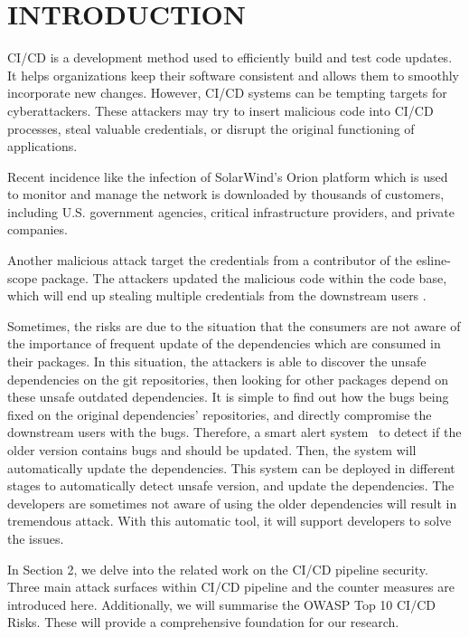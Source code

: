 \section{INTRODUCTION}
CI/CD is a development method used to efficiently build and test code updates. 
It helps organizations keep their software consistent and allows them to smoothly 
incorporate new changes. However, CI/CD systems can be tempting targets for cyberattackers. 
These attackers may try to insert malicious code into CI/CD processes, 
steal valuable credentials, or disrupt the original functioning of applications\cite{sonatype2020}.

Recent incidence like the infection of SolarWind's Orion platform \cite{ladisa2023sok, 
peisert2021perspectives} which is used to monitor and manage the network is downloaded by 
thousands of customers, including U.S. government agencies, critical infrastructure providers, 
and private companies. 

Another malicious attack target the credentials from a contributor of the esline-scope package.
The attackers updated the malicious code within the code base, which will end up stealing
multiple credentials from the downstream users \cite{eslint2018}.

Sometimes, the risks are due to the situation that the consumers are not aware of the importance 
of frequent update of the dependencies which are consumed in their packages. In this situation,
the attackers is able to discover the unsafe dependencies on the git repositories, then looking for
other packages depend on these unsafe outdated dependencies. It is simple to find out how the bugs being
fixed on the original dependencies' repositories, and directly compromise the downstream users with the bugs.
Therefore, a smart alert system~\cite{wang2020empirical} to detect if the older version contains
bugs and should be updated. Then, the system will automatically update the dependencies. This system can be deployed
in different stages to automatically detect unsafe version, and update the dependencies. The developers 
are sometimes not aware of using the older dependencies will result in tremendous attack. With this automatic tool,
it will support developers to solve the issues.

In Section 2, we delve into the related work on the CI/CD pipeline security. Three main 
attack surfaces within CI/CD pipeline and the counter measures are introduced here. 
Additionally, we will summarise the OWASP Top 10 CI/CD Risks. These will provide a comprehensive
foundation for our research. 

